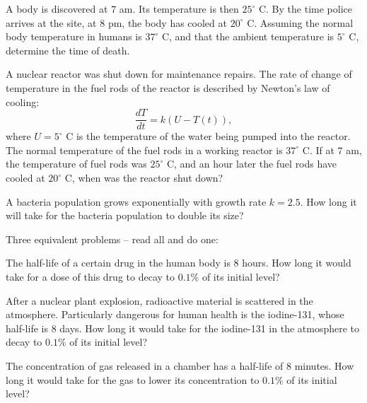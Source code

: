 \begin{multicols}{2}
A body is discovered at $7$ am. Its temperature is then $25^{\circ}$ C. By the
time police arrives at the site, at $8$ pm, the body has cooled at $20^{\circ}$
C. Assuming the normal body temperature in humans is $37^{\circ}$ C, and that
the ambient temperature is $5^{\circ}$ C, determine the time of death.




\subprob A nuclear reactor was shut down for maintenance repairs. The rate of
change of temperature in the fuel rods of the reactor is described by Newton's
law of cooling:
\[
  \frac{dT}{dt}=k\left(U-T(t)\right),
\]
where $U=5^{\circ}$ C is the temperature of the water being pumped into the
reactor. The normal temperature of the fuel rods in a working reactor is
$37^{\circ}$ C.  If at $7$ am, the temperature of fuel rods was $25^{\circ}$ C,
and an hour later the fuel rods have cooled at $20^{\circ}$ C, when was the
reactor shut down?




\problem A bacteria population grows exponentially with growth rate $k=2.5$. How %
long it will take for the bacteria population to double its size?




\problem Three equivalent problems -- read all and do one: %




\subprob The half-life of a certain drug in the human body is $8$ hours. How
long it would take for a dose of this drug to decay to $0.1\%$ of its initial
level?




\subprob After a nuclear plant explosion, radioactive material is scattered in
the atmosphere. Particularly dangerous for human health is the iodine-131,
whose half-life is $8$ days. How long it would take for the iodine-131 in the
atmosphere to decay to $0.1\%$ of its initial level?




\subprob The concentration of gas released in a chamber has a half-life of $8$
minutes. How long it would take for the gas to lower its concentration to
$0.1\%$ of its initial level?





\end{multicols}
